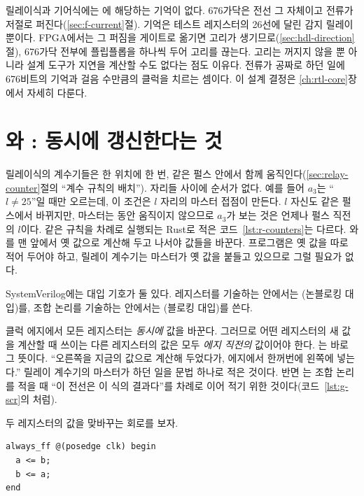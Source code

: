 릴레이식과 기어식에는 에 해당하는 기억이 없다. 676가닥은 전선 그 자체이고 전류가 저절로
퍼진다(\ref{sec:f-current}절). 기억은 테스트 레지스터의 26선에 달린 감지 릴레이뿐이다. FPGA에서는 그 퍼짐을
게이트로 옮기면 고리가 생기므로(\ref{sec:hdl-direction}절), 676가닥 전부에 플립플롭을 하나씩 두어 고리를 끊는다.
고리는 꺼지지 않을 뿐 아니라 설계 도구가 지연을 계산할 수도 없다는 점도 이유다. 전류가 공짜로 하던 일에
676비트의 기억과 걸음 수만큼의 클럭을 치르는 셈이다. 이 설계 결정은 \ref{ch:rtl-core}장에서 자세히 다룬다.

\section{\texorpdfstring{\code{<=}와 \code{=}}{<=와 =}: 동시에 갱신한다는 것}

\Relay 릴레이식의 계수기들은 한 위치에 한 번, 같은  펄스 안에서 함께 움직인다(\ref{sec:relay-counter}절의
``계수 규칙의 배치''). 자리들 사이에 순서가 없다. 예를 들어 $a_3$는 ``$l \ne 25$''일 때만 오르는데,
이 조건은 $l$ 자리의 마스터 접점이 만든다. $l$ 자신도 같은 펄스에서 바뀌지만, 마스터는  동안 움직이지
않으므로 $a_3$가 보는 것은 언제나 펄스 직전의 $l$이다. 같은 규칙을 차례로 실행되는 Rust로 적은
코드~\ref{lst:r-counters}는 다르다. 와 를 맨 앞에서 옛 값으로 계산해 두고 나서야
값들을 바꾼다. 프로그램은 옛 값을 따로 적어 두어야 하고, 릴레이 계수기는 마스터가 옛 값을 붙들고 있으므로 그럴
필요가 없다.

SystemVerilog에는 대입 기호가 둘 있다. 레지스터를 기술하는  안에서는 \code{<=}(논블로킹
대입)를, 조합 논리를 기술하는  안에서는 \code{=}(블로킹 대입)를 쓴다.

\Why 클럭 에지에서 모든 레지스터는 \emph{동시에} 값을 바꾼다. 그러므로 어떤 레지스터의 새 값을 계산할 때
쓰이는 다른 레지스터의 값은 모두 \emph{에지 직전의} 값이어야 한다. \code{<=}는 바로 그 뜻이다. ``오른쪽을
지금의 값으로 계산해 두었다가, 에지에서 한꺼번에 왼쪽에 넣는다.'' 릴레이 계수기의 마스터가 하던 일을 문법
하나로 적은 것이다. 반면 \code{=}는 조합 논리를 적을 때 ``이 전선은 이 식의 결과다''를 차례로 이어 적기 위한
것이다(코드~\ref{lst:g-scr}의 처럼).

\General 두 레지스터의 값을 맞바꾸는 회로를 보자.

\begin{lstlisting}[language=SV,numbers=none]
always_ff @(posedge clk) begin
  a <= b;
  b <= a;
end
\end{lstlisting}

